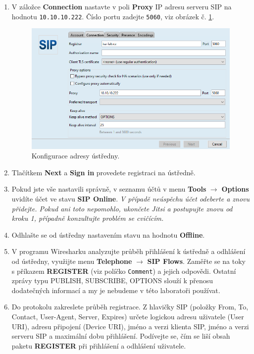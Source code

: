 \begin{enumerate}
    \item V záložce {\bf Connection} nastavte v poli {\bf Proxy} IP adresu serveru SIP na hodnotu {\tt 10.10.10.222}. Číslo portu zadejte {\tt 5060}, viz obrázek č. \ref{fig:registration2}. 
      \begin{figure}[h!]
        \centering
        \includegraphics[scale=0.7]{img/jitsi-registration2b.png}
        \caption{Konfigurace adresy ústředny.}
        \label{fig:registration2}
      \end{figure}
    \item Tlačítkem {\bf Next} a {\bf Sign in} provedete registraci na ústředně.
    \item  Pokud jste vše nastavili správně, v seznamu účtů v menu {\bf Tools} $\rightarrow$ {\bf Options} uvidíte účet ve stavu {\bf SIP Online}. {\it V případě neúspěchu účet odeberte a znovu přidejte. Pokud ani toto nepomohlo, ukončete Jitsi a postupujte znovu od kroku 1, případně konzultujte problém se cvičícím.}
    \item Odhlašte se od ústředny nastavením stavu na hodnotu {\bf Offline}. 
    \item V programu Wiresharku analyzujte průběh přihlášení k ústředně a odhlášení od ústředny, využijte menu {\bf Telephone} $\rightarrow$ {\bf SIP Flows}. Zaměřte se na toky s příkazem {\bf REGISTER} (viz políčko {\tt Comment}) a jejich odpovědi. Ostatní zprávy typu PUBLISH, SUBSCRIBE, OPTIONS slouží k přenosu dodatečných informací a my je nebudeme v této laboratoři používat.
    \item Do protokolu zakreslete průběh registrace. Z hlavičky SIP (položky From, To, Contact, User-Agent, Server, Expires) určete logickou adresu uživatele (User URI), adresu připojení (Device URI), jméno a verzi klienta SIP, jméno a verzi serveru SIP a maximální dobu přihlášení. Podívejte se, čím se liší obsah paketu {\bf REGISTER} při přihlášení a odhlášení uživatele.
\end{enumerate}

